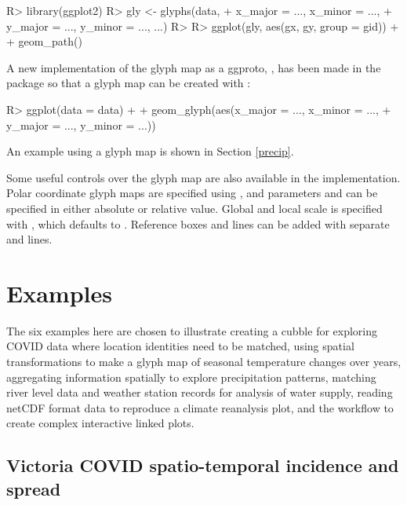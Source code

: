 \documentclass[
]{jss}
\begin{document}
\begin{CodeChunk}
\begin{CodeInput}
R> library(ggplot2)
R> gly <- glyphs(data,
+               x_major = ..., x_minor = ...,
+               y_major = ..., y_minor = ..., ...)
R> 
R> ggplot(gly, aes(gx, gy, group = gid)) +
+   geom_path()
\end{CodeInput}
\end{CodeChunk}

A new implementation of the glyph map as a ggproto, , has been made in the  package so that a glyph map can be created with :

\begin{CodeChunk}
\begin{CodeInput}
R> ggplot(data = data) +
+   geom_glyph(aes(x_major = ..., x_minor = ...,
+                  y_major = ..., y_minor = ...))
\end{CodeInput}
\end{CodeChunk}

An example using a glyph map is shown in Section \ref{precip}.

Some useful controls over the glyph map are also available in the  implementation. Polar coordinate glyph maps are specified using , and parameters  and  can be specified in either absolute or relative value. Global and local scale is specified with , which defaults to . Reference boxes and lines can be added with separate  and  lines.

\hypertarget{examples}{%
\section{Examples}\label{examples}}

The six examples here are chosen to illustrate creating a cubble for exploring COVID data where location identities need to be matched, using spatial transformations to make a glyph map of seasonal temperature changes over years, aggregating information spatially to explore precipitation patterns, matching river level data and weather station records for analysis of water supply, reading netCDF format data to reproduce a climate reanalysis plot, and the workflow to create complex interactive linked plots.

\hypertarget{covid}{%
\subsection{Victoria COVID spatio-temporal incidence and spread}\label{covid}}
\end{document}
